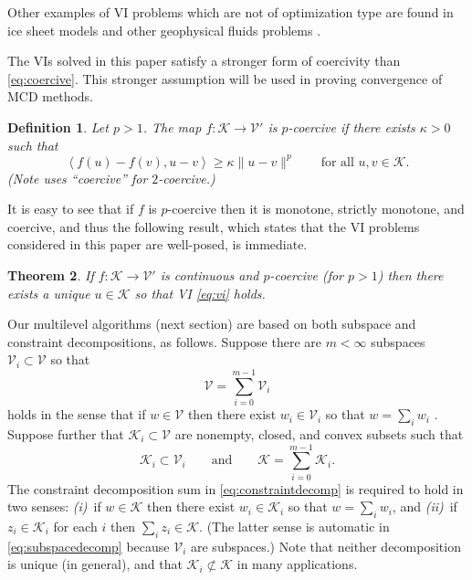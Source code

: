 \documentclass[letterpaper,final,12pt,reqno]{amsart}
\theoremstyle{cstyle}
\newtheorem{theorem}{Theorem}
\theoremstyle{dstyle}
\newtheorem{definition}[theorem]{Definition}
\numberwithin{equation}{section}
\numberwithin{figure}{section}
\numberwithin{table}{section}
\numberwithin{theorem}{section}
\newcommand{\cK}{\mathcal{K}}
\newcommand{\cV}{\mathcal{V}}
\newcommand{\ip}[2]{\left<#1,#2\right>}
\begin{document}
Other examples of VI problems which are not of optimization type are found in ice sheet models \cite{Calvoetal2002,JouvetBueler2012} and other geophysical fluids problems \cite{Bueler2021conservation}.

The VIs solved in this paper satisfy a stronger form of coercivity than \eqref{eq:coercive}.  This stronger assumption will be used in proving convergence of MCD methods.

\begin{definition}  Let $p>1$.  The map $f:\cK \to \cV'$ is \emph{$p$-coercive} if there exists $\kappa>0$ such that
\begin{equation}
\ip{f(u)-f(v)}{u-v} \ge \kappa \|u-v\|^p \qquad \text{for all } u,v \in \cK. \label{eq:pcoercive}
\end{equation}
(Note \cite{Tai2003} uses ``coercive'' for $2$-coercive.)
\end{definition}

It is easy to see that if $f$ is $p$-coercive then it is monotone, strictly monotone, and coercive, and thus the following result, which states that the VI problems considered in this paper are well-posed, is immediate.

\begin{theorem}  \label{thm:viwellposed}  If $f:\cK \to \cV'$ is continuous and $p$-coercive (for $p>1$) then there exists a unique $u\in \cK$ so that VI \eqref{eq:vi} holds.
\end{theorem}

Our multilevel algorithms (next section) are based on both subspace and constraint decompositions, as follows.  Suppose there are $m<\infty$ subspaces $\cV_i \subset \cV$ so that
\begin{equation}
\cV = \sum_{i=0}^{m-1} \cV_i \label{eq:subspacedecomp}
\end{equation}
holds in the sense that if $w \in \cV$ then there exist $w_i \in \cV_i$ so that $w = \sum_i w_i$ \cite{Xu1992}.  Suppose further that $\cK_i \subset \cV$ are nonempty, closed, and convex subsets such that
\begin{equation}
\cK_i \subset \cV_i \qquad \text{and} \qquad \cK = \sum_{i=0}^{m-1} \cK_i. \label{eq:constraintdecomp}
\end{equation}
The constraint decomposition \cite{Tai2003} sum in \eqref{eq:constraintdecomp} is required to hold in two senses: \emph{(i)}~if $w \in \cK$ then there exist $w_i \in \cK_i$ so that $w = \sum_i w_i$, and \emph{(ii)}~if $z_i \in \cK_i$ for each $i$ then $\sum_i z_i \in \cK$.  (The latter sense is automatic in \eqref{eq:subspacedecomp} because $\cV_i$ are subspaces.)  Note that neither decomposition is unique (in general), and that $\cK_i \not\subset \cK$ in many applications.
\end{document}
